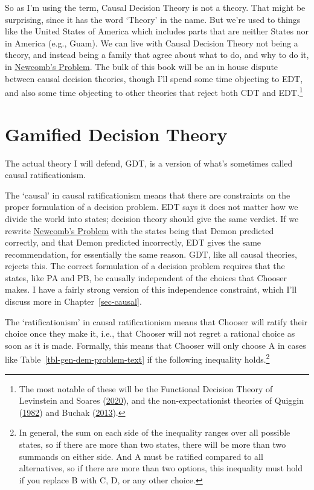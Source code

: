 \documentclass[
  12pt,
  letterpaper,
  DIV=11,
  numbers=noendperiod]{scrreprt}
\begin{document}
So as I'm using the term, Causal Decision Theory is not a theory. That
might be surprising, since it has the word `Theory' in the name. But
we're used to things like the United States of America which includes
parts that are neither States nor in America (e.g., Guam). We can live
with Causal Decision Theory not being a theory, and instead being a
family that agree about what to do, and why to do it, in
\protect\hyperlink{tbl-newcomb}{Newcomb's Problem}. The bulk of this
book will be an in house dispute between causal decision theories,
though I'll spend some time objecting to EDT, and also some time
objecting to other theories that reject both CDT and EDT.\footnote{The
  most notable of these will be the Functional Decision Theory of
  Levinstein and Soares
  (\protect\hyperlink{ref-LevinsteinSoares2020}{2020}), and the
  non-expectationist theories of Quiggin
  (\protect\hyperlink{ref-Quiggin1982}{1982}) and Buchak
  (\protect\hyperlink{ref-BuchakRisk}{2013}).}

\hypertarget{sec-gdt-defined}{%
\section{Gamified Decision Theory}\label{sec-gdt-defined}}

The actual theory I will defend, GDT, is a version of what's sometimes
called causal ratificationism.

The `causal' in causal ratificationism means that there are constraints
on the proper formulation of a decision problem. EDT says it does not
matter how we divide the world into states; decision theory should give
the same verdict. If we rewrite
\protect\hyperlink{tbl-newcomb}{Newcomb's Problem} with the states being
that Demon predicted correctly, and that Demon predicted incorrectly,
EDT gives the same recommendation, for essentially the same reason. GDT,
like all causal theories, rejects this. The correct formulation of a
decision problem requires that the states, like PA and PB, be causally
independent of the choices that Chooser makes. I have a fairly strong
version of this independence constraint, which I'll discuss more in
Chapter~\ref{sec-causal}.

The `ratificationism' in causal ratificationism means that Chooser will
ratify their choice once they make it, i.e., that Chooser will not
regret a rational choice as soon as it is made. Formally, this means
that Chooser will only choose A in cases like
Table~\ref{tbl-gen-dem-problem-text} if the following inequality
holds.\footnote{In general, the sum on each side of the inequality
  ranges over all possible states, so if there are more than two states,
  there will be more than two summands on either side. And A must be
  ratified compared to all alternatives, so if there are more than two
  options, this inequality must hold if you replace B with C, D, or any
  other choice.}
\end{document}
